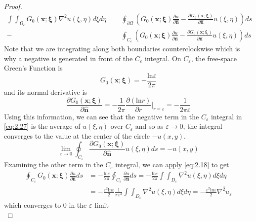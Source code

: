 \documentclass{article}
\newcommand{\pd}[2]{\frac{\partial #1}{\partial #2}}
\newcommand{\vb}[1]{\mathbf{ #1}}
\newcommand{\lap}{\nabla ^2}
\newcommand{\pull}{\! \! \!}
\newcommand{\dint}{\int \pull \int}
\newcommand{\fsgf}{G_0(\vb{x};\boldsymbol{\xi})}
\newcommand{\un}{\mathbf{\hat{n}}}
\numberwithin{equation}{section}
\begin{document}
\begin{proof}
    \begin{equation}
    \begin{split}
        \dint_{\Omega_\varepsilon}  \fsgf \lap u(\xi, \eta) d\xi d\eta = &\oint_{\partial \Omega}\left(\fsgf\pd{u}{\un}-\pd{\fsgf}{\un} u(\xi,\eta)\right) ds \\ -& \oint_{C_\varepsilon}\left(\fsgf\pd{u}{\un}-\pd{\fsgf}{\un} u(\xi,\eta)\right) ds \label{eq:2.27}
        \end{split}
    \end{equation}
    Note that we are integrating along both boundaries counterclockwise which is why a negative is generated in front of the $C_\varepsilon$ integral. On $C_\varepsilon$, the free-space Green's Function is 
    \begin{equation*}
        \fsgf = -\frac{\text{ln}\varepsilon}{2\pi}
    \end{equation*} 
    and its normal derivative is 
    \begin{equation*}
        \pd{\fsgf}{\un} =-\frac{1}{2\pi}\pd{(\text{ln}r)}{r} \bigg|_{r=\varepsilon} = -\frac{1}{2\pi \varepsilon} 
    \end{equation*}
    Using this information, we can see that the negative term in the $C_\varepsilon$ integral in \eqref{eq:2.27} is the average of $u(\xi,\eta)$ over $C_\varepsilon$ and so as $\varepsilon \rightarrow0$, the integral converges to the value at the center of the circle $-u(x,y)$.
    \begin{equation*}
        \lim_{\varepsilon\rightarrow0}\oint_{C_\varepsilon}\pd{\fsgf}{\un} u(\xi,\eta)ds =-u(x,y)
    \end{equation*}
    Examining the other term in the $C_\varepsilon$ integral, we can apply \eqref{eq:2.18} to get 
    \begin{equation}
    \begin{split}
        \oint_{C_\varepsilon}\fsgf\pd{u}{\un}ds & = -\frac{\text{ln}\varepsilon}{2\pi} \oint_{C_\varepsilon} \pd{u}{\un}ds = -\frac{\text{ln}\varepsilon}{2\pi} \dint_{D_\varepsilon} \lap u(\xi,\eta) d\xi d\eta 
        \\ & = -\frac{\varepsilon^2 \text{ln}\varepsilon}{2} \frac{1}{\pi \varepsilon^2}\dint_{D_\varepsilon} \lap u(\xi,\eta) d\xi d\eta= -\frac{\varepsilon^2 \text{ln}\varepsilon}{2}\overline{\lap u_\varepsilon}
    \end{split}
    \end{equation}
    which converges to 0 in the $\varepsilon$ limit
    \begin{equation*}

\end{equation*}
\end{proof}
\end{document}
